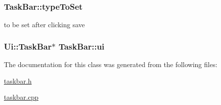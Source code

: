 \subsubsection[{\texorpdfstring{type\+To\+Set}{typeToSet}}]{ Task\+Bar\+::type\+To\+Set\hspace{0.3cm}{\ttfamily [private]}}\hypertarget{classTaskBar_a84684467e8038096bee94cdd1f26180c}{}\label{classTaskBar_a84684467e8038096bee94cdd1f26180c}


to be set after clicking save 

\subsubsection[{\texorpdfstring{ui}{ui}}]{\setlength{\rightskip}{0pt plus 5cm}Ui\+::\+Task\+Bar$\ast$ Task\+Bar\+::ui\hspace{0.3cm}{\ttfamily [private]}}\hypertarget{classTaskBar_adf231c032cb316cc500191fa349de0c8}{}\label{classTaskBar_adf231c032cb316cc500191fa349de0c8}


The documentation for this class was generated from the following files\+:\begin{DoxyCompactItemize}
\item 
\hyperlink{taskbar_8h}{taskbar.\+h}\item 
\hyperlink{taskbar_8cpp}{taskbar.\+cpp}\end{DoxyCompactItemize}
